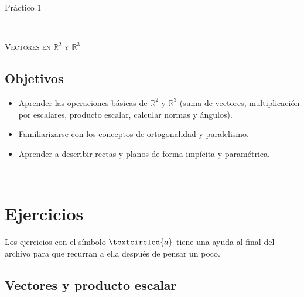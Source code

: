 \documentclass[12pt]{amsart}
\begin{document}



\centerline{\Large{Pr\' actico 1}}

\

\centerline{\textsc{Vectores en $\mathbb R^2$ y $\mathbb R^3$}}


\bigbreak

\subsection*{Objetivos}

\begin{itemize}
 \item Aprender las operaciones b\'asicas de $\mathbb R^2$ y $\mathbb R^3$ (suma de vectores, multiplicaci\'on por escalares, producto escalar, calcular normas y \'angulos).
 \item Familiarizarse con los conceptos de ortogonalidad y paralelismo.
 \item Aprender a describir rectas y planos de forma imp\'icita y param\'etrica.
\end{itemize}

\

\section*{Ejercicios}

Los ejercicios con el s\'imbolo $\textcircled{a}$ tiene una ayuda al final del archivo para que recurran a ella despu\'es de pensar un poco.


\subsection*{Vectores y producto escalar}
\end{document}
